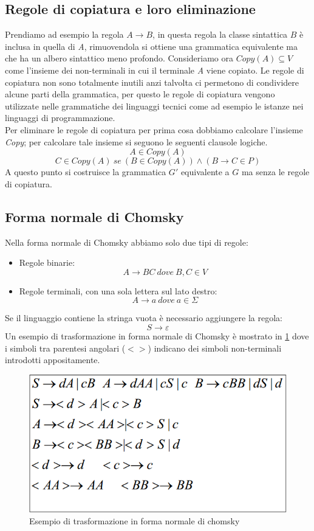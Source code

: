 \subsection{Regole di copiatura e loro eliminazione}
Prendiamo ad esempio la regola $A\rightarrow B$, in questa regola la classe sintattica $ B $ è inclusa in quella di \emph{A}, rimuovendola si ottiene una grammatica equivalente ma che ha un albero sintattico meno profondo.
Consideriamo ora $ Copy(A)\subseteq V $ come l'insieme dei non-terminali in cui il terminale \emph{A} viene copiato. Le regole di copiatura non sono totalmente inutili anzi talvolta ci permetono di condividere alcune parti della grammatica, per questo le regole di copiatura vengono utilizzate nelle grammatiche dei linguaggi tecnici come ad esempio le istanze nei linguaggi di programmazione.\\
Per eliminare le regole di copiatura per prima cosa dobbiamo calcolare l'insieme \emph{Copy}; per calcolare tale insieme si seguono le seguenti clausole logiche.
$$A \in Copy(A)$$
$$C \in Copy(A) \ se \ (B\in Copy(A))\wedge (B\rightarrow C \in P)$$
A questo punto si costruisce la grammatica $ G' $ equivalente a $ G $ ma senza le regole di copiatura.
\subsection{Forma normale di Chomsky}
Nella forma normale di Chomsky abbiamo solo due tipi di regole:
\begin{itemize}
	\item Regole binarie:
	$$A\rightarrow BC \ dove \ B,C \in V$$
	\item Regole terminali, con una sola lettera sul lato destro:
	$$A \rightarrow a \ dove \ a\in\Sigma$$
\end{itemize}
Se il linguaggio contiene la stringa vuota è  necessario aggiungere la regola:
$$S\rightarrow \varepsilon$$
Un esempio di trasformazione in forma normale di Chomsky è mostrato in \figurename \ref{fig:chomsky} dove i simboli tra parentesi angolari ($ < > $) indicano dei simboli non-terminali introdotti appositamente.
\begin{figure}
	\centering
	\includegraphics[width=0.5\linewidth]{img/chomsky.png}
	\caption{Esempio di trasformazione in forma normale di chomsky}\label{fig:chomsky}
\end{figure}
